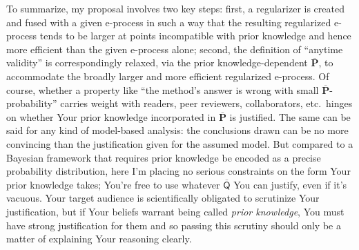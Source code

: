 \documentclass[a4paper, 12pt]{article}
\theoremstyle{plain}
\theoremstyle{definition}
\theoremstyle{remark}
\newcommand{\credal}{\mathscr{Q}}
\newcommand{\uprior}{\overline{\mathsf{Q}}}
\newcommand{\uuprob}{\mathbf{\overline{P}}}
\begin{document}

To summarize, my proposal involves two key steps: first, a regularizer is created and fused with a given e-process in such a way that the resulting regularized e-process tends to be larger at points incompatible with prior knowledge and hence more efficient than the given e-process alone; second, the definition of ``anytime validity'' is correspondingly relaxed, via the prior knowledge-dependent $\uuprob$, to accommodate the broadly larger and more efficient regularized e-process.  Of course, whether a property like ``the method's answer is wrong with small $\uuprob$-probability'' carries weight with readers, peer reviewers, collaborators, etc.~hinges on whether Your prior knowledge incorporated in $\uuprob$ is justified.  The same can be said for any kind of model-based analysis: the conclusions drawn can be no more convincing than the justification given for the assumed model.  But compared to a Bayesian framework that requires prior knowledge be encoded as a precise probability distribution, here I'm placing no serious constraints on the form Your prior knowledge takes; You're free to use whatever $\uprior$ You can justify, even if it's vacuous.  Your target audience is scientifically obligated to scrutinize Your justification, but if Your beliefs warrant being called {\em prior knowledge}, You must have strong justification for them and so passing this scrutiny should only be a matter of explaining Your reasoning clearly.  
\end{document}
